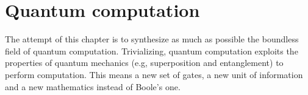 \chapter{Quantum computation}
The attempt of this chapter is to synthesize as much as possible the boundless field of quantum computation. Trivializing, quantum computation exploits the properties of quantum mechanics (e.g, superposition and entanglement) to perform computation. 
This means a new set of gates, a new unit of information and a new mathematics instead of Boole's one.


